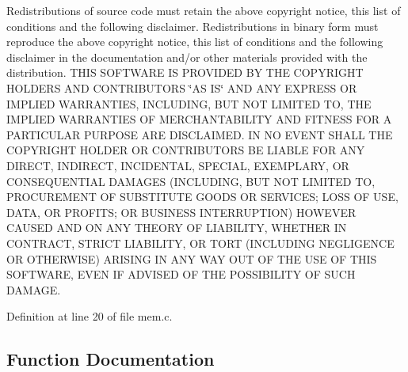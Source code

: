 Redistributions of source code must retain the above copyright notice, this list of conditions and the following disclaimer. Redistributions in binary form must reproduce the above copyright notice, this list of conditions and the following disclaimer in the documentation and/or other materials provided with the distribution. T\+H\+IS S\+O\+F\+T\+W\+A\+RE IS P\+R\+O\+V\+I\+D\+ED BY T\+HE C\+O\+P\+Y\+R\+I\+G\+HT H\+O\+L\+D\+E\+RS A\+ND C\+O\+N\+T\+R\+I\+B\+U\+T\+O\+RS \char`\"{}\+A\+S I\+S\char`\"{} A\+ND A\+NY E\+X\+P\+R\+E\+SS OR I\+M\+P\+L\+I\+ED W\+A\+R\+R\+A\+N\+T\+I\+ES, I\+N\+C\+L\+U\+D\+I\+NG, B\+UT N\+OT L\+I\+M\+I\+T\+ED TO, T\+HE I\+M\+P\+L\+I\+ED W\+A\+R\+R\+A\+N\+T\+I\+ES OF M\+E\+R\+C\+H\+A\+N\+T\+A\+B\+I\+L\+I\+TY A\+ND F\+I\+T\+N\+E\+SS F\+OR A P\+A\+R\+T\+I\+C\+U\+L\+AR P\+U\+R\+P\+O\+SE A\+RE D\+I\+S\+C\+L\+A\+I\+M\+ED. IN NO E\+V\+E\+NT S\+H\+A\+LL T\+HE C\+O\+P\+Y\+R\+I\+G\+HT H\+O\+L\+D\+ER OR C\+O\+N\+T\+R\+I\+B\+U\+T\+O\+RS BE L\+I\+A\+B\+LE F\+OR A\+NY D\+I\+R\+E\+CT, I\+N\+D\+I\+R\+E\+CT, I\+N\+C\+I\+D\+E\+N\+T\+AL, S\+P\+E\+C\+I\+AL, E\+X\+E\+M\+P\+L\+A\+RY, OR C\+O\+N\+S\+E\+Q\+U\+E\+N\+T\+I\+AL D\+A\+M\+A\+G\+ES (I\+N\+C\+L\+U\+D\+I\+NG, B\+UT N\+OT L\+I\+M\+I\+T\+ED TO, P\+R\+O\+C\+U\+R\+E\+M\+E\+NT OF S\+U\+B\+S\+T\+I\+T\+U\+TE G\+O\+O\+DS OR S\+E\+R\+V\+I\+C\+ES; L\+O\+SS OF U\+SE, D\+A\+TA, OR P\+R\+O\+F\+I\+TS; OR B\+U\+S\+I\+N\+E\+SS I\+N\+T\+E\+R\+R\+U\+P\+T\+I\+ON) H\+O\+W\+E\+V\+ER C\+A\+U\+S\+ED A\+ND ON A\+NY T\+H\+E\+O\+RY OF L\+I\+A\+B\+I\+L\+I\+TY, W\+H\+E\+T\+H\+ER IN C\+O\+N\+T\+R\+A\+CT, S\+T\+R\+I\+CT L\+I\+A\+B\+I\+L\+I\+TY, OR T\+O\+RT (I\+N\+C\+L\+U\+D\+I\+NG N\+E\+G\+L\+I\+G\+E\+N\+CE OR O\+T\+H\+E\+R\+W\+I\+SE) A\+R\+I\+S\+I\+NG IN A\+NY W\+AY O\+UT OF T\+HE U\+SE OF T\+H\+IS S\+O\+F\+T\+W\+A\+RE, E\+V\+EN IF A\+D\+V\+I\+S\+ED OF T\+HE P\+O\+S\+S\+I\+B\+I\+L\+I\+TY OF S\+U\+CH D\+A\+M\+A\+GE. 

Definition at line 20 of file mem.\+c.



\subsection{Function Documentation}
\mbox{\label{a00116_a9087e3504e5973deee6f3561705978c7_a9087e3504e5973deee6f3561705978c7}} 
